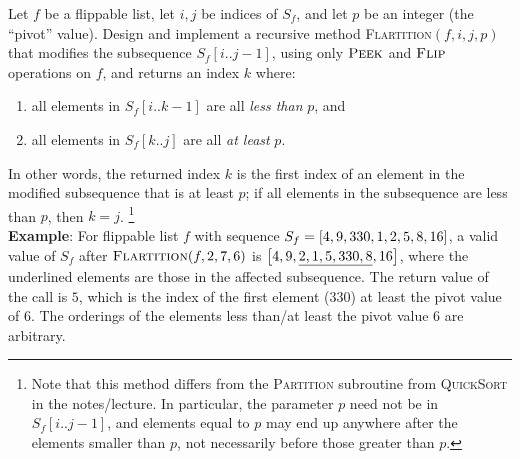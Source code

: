 \documentclass[11pt]{article}
\begin{document}
\begin{question}
Let $f$ be a flippable list, let $i,j$ be indices of $S_f$, and let $p$ be an integer (the ``pivot'' value). Design and implement a recursive method 
\textsc{Flartition}$(f,i,j,p)$ that modifies the subsequence $S_f[i..j-1]$, using only $\textsc{Peek}$ and $\textsc{Flip}$ operations on $f$, and returns an index $k$ where:
\begin{enumerate}
    \item all elements in $S_f[i..k-1]$ are all \emph{less than} $p$, and
    \item all elements in $S_f[k..j]$ are all \emph{at least} $p$.
\end{enumerate}
In other words, the returned index $k$ is the first index of an element in the modified subsequence that is at least $p$; if all elements in the subsequence are less than $p$, then $k=j$.
\footnote{Note that this method differs from the \textsc{Partition} subroutine from \textsc{QuickSort} in the notes/lecture. In particular, the parameter $p$ need not be in $S_f[i..j-1]$, and elements equal to $p$ may end up anywhere after the elements smaller than $p$, not necessarily before those greater than $p$.} \\

\textbf{Example}: For flippable list $f$ with sequence $S_f = \left[ 4,9,330,1,2,5,8,16 \right]$, a valid value of $S_f$ after $\textsc{Flartition}(f,2,7,6)$ is $\left[ 4, 9, \underline{2, 1, 5, 330, 8}, 16 \right]$, where the underlined elements are those in the affected subsequence. The return value of the call is $5$, which is the index of the first element ($330$) at least the pivot value of $6$. The orderings of the elements less than/at least the pivot value $6$ are arbitrary.\\


\end{question}

\end{document}

